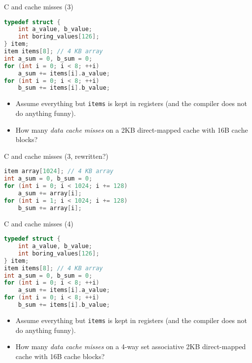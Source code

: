 

\begin{frame}[fragile,label=arrayMissesSparse1]{C and cache misses (3)}
\begin{lstlisting}[language=C,style=small]
typedef struct {
    int a_value, b_value;
    int boring_values[126];
} item;
item items[8]; // 4 KB array
int a_sum = 0, b_sum = 0;
for (int i = 0; i < 8; ++i)
    a_sum += items[i].a_value;
for (int i = 0; i < 8; ++i)
    b_sum += items[i].b_value;
\end{lstlisting}
    \begin{itemize}
        \item {\small
    Assume everything but {\tt items} is kept in registers (and the compiler does not do
    anything funny).
        }
    \item
How many \textit{data cache misses} on a 2KB direct-mapped cache with 16B cache blocks?
    \end{itemize}
\end{frame}


\begin{frame}[fragile,label=arrayMissesSparse1b]{C and cache misses (3, rewritten?)}
\begin{lstlisting}[language=C,style=small]
item array[1024]; // 4 KB array
int a_sum = 0, b_sum = 0;
for (int i = 0; i < 1024; i += 128)
    a_sum += array[i];
for (int i = 1; i < 1024; i += 128)
    b_sum += array[i];
\end{lstlisting}
\end{frame}

\begin{frame}[fragile,label=arrayMissesSparse2]{C and cache misses (4)}
\begin{lstlisting}[language=C,style=small]
typedef struct {
    int a_value, b_value;
    int boring_values[126];
} item;
item items[8]; // 4 KB array
int a_sum = 0, b_sum = 0;
for (int i = 0; i < 8; ++i)
    a_sum += items[i].a_value;
for (int i = 0; i < 8; ++i)
    b_sum += items[i].b_value;
\end{lstlisting}
    \begin{itemize}
        \item {\small
    Assume everything but {\tt items} is kept in registers (and the compiler does not do
    anything funny).
        }
    \item
How many \textit{data cache misses} on a 4-way set associative 2KB direct-mapped cache with 16B cache blocks?
    \end{itemize}
\end{frame}
